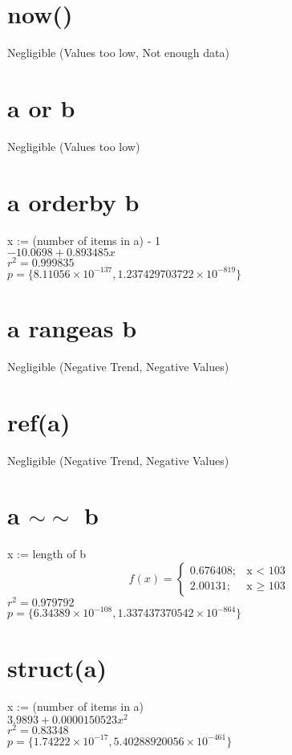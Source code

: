 \documentclass[12pt]{article}
\begin{document}
	\section{now()}
	Negligible (Values too low, Not enough data)
	
	\section{a or b}
	Negligible (Values too low)
	
	\section{a orderby b} %
	x := (number of items in a) - 1\\
	$-10.0698 + 0.893485 x$\\
	$r^2 = 0.999835$\\
	$p = \{8.11056 \times 10^{-137}, 1.237429703722 \times 10^{-819}\}$
	
	\section{a rangeas b}
	Negligible (Negative Trend, Negative Values)
	
	\section{ref(a)}
	Negligible (Negative Trend, Negative Values)
	
	\section{a $\sim\sim$ b}
	x := length of b
	\begin{displaymath}
		f(x) = \left\{
			\begin{array}{lr}
				0.676408; & \text{x $<$ 103}\\
				2.00131; & \text{x $\geq$ 103}
			\end{array}
		\right.
	\end{displaymath}
	$r^2 = 0.979792$\\
	$p = \{6.34389 \times 10^{-108}, 1.337437370542 \times 10^{-864}\}$
	
	\section{struct(a)}
	x := (number of items in a)\\
	$3.9893 + 0.0000150523 x^2$\\
	$r^2 = 0.83348$\\
	$p = \{1.74222 \times 10^{-17}, 5.40288920056 \times 10^{-461}\}$
	
\end{document}
